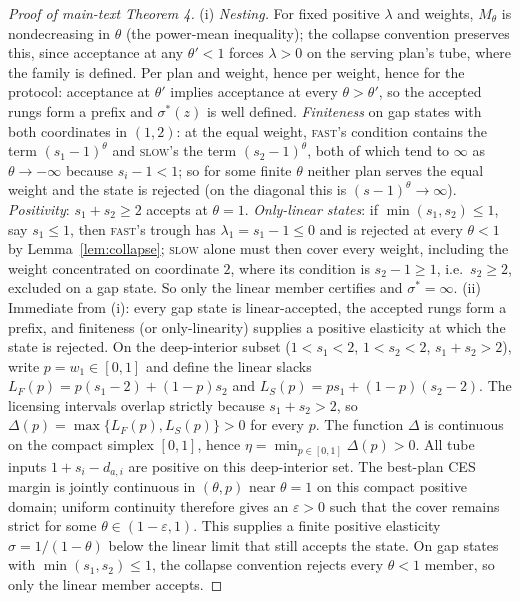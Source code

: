 \documentclass[preprint,11pt,authoryear]{elsarticle}
\theoremstyle{remark}
\newcommand{\act}[1]{\textsc{#1}}
\begin{document}
\begin{proof}[Proof of main-text Theorem 4]
(i) \emph{Nesting.} For fixed positive $\lambda$ and weights, $M_\theta$ is nondecreasing in $\theta$ (the power-mean inequality); the collapse convention preserves this, since acceptance at any $\theta'<1$ forces $\lambda>0$ on the serving plan's tube, where the family is defined. Per plan and weight, hence per weight, hence for the protocol: acceptance at $\theta'$ implies acceptance at every $\theta>\theta'$, so the accepted rungs form a prefix and $\sigma^*(z)$ is well defined. \emph{Finiteness} on gap states with both coordinates in $(1,2)$: at the equal weight, \act{fast}'s condition contains the term $(s_1-1)^\theta$ and \act{slow}'s the term $(s_2-1)^\theta$, both of which tend to $\infty$ as $\theta\to-\infty$ because $s_i-1<1$; so for some finite $\theta$ neither plan serves the equal weight and the state is rejected (on the diagonal this is $(s-1)^\theta\to\infty$). \emph{Positivity}: $s_1+s_2\ge2$ accepts at $\theta=1$. \emph{Only-linear states}: if $\min(s_1,s_2)\le1$, say $s_1\le1$, then \act{fast}'s trough has $\lambda_1=s_1-1\le0$ and is rejected at every $\theta<1$ by Lemma~\ref{lem:collapse}; \act{slow} alone must then cover every weight, including the weight concentrated on coordinate $2$, where its condition is $s_2-1\ge1$, i.e.\ $s_2\ge2$, excluded on a gap state. So only the linear member certifies and $\sigma^*=\infty$.
(ii) Immediate from (i): every gap state is linear-accepted, the accepted rungs form a prefix, and finiteness (or only-linearity) supplies a positive elasticity at which the state is rejected. On the deep-interior subset ($1<s_1<2$, $1<s_2<2$, $s_1+s_2>2$), write $p=w_1\in[0,1]$ and define the linear slacks $L_F(p)=p(s_1-2)+(1-p)s_2$ and $L_S(p)=ps_1+(1-p)(s_2-2)$. The licensing intervals overlap strictly because $s_1+s_2>2$, so $\Delta(p)=\max\{L_F(p),L_S(p)\}>0$ for every $p$. The function $\Delta$ is continuous on the compact simplex $[0,1]$, hence $\eta=\min_{p\in[0,1]}\Delta(p)>0$. All tube inputs $1+s_i-d_{a,i}$ are positive on this deep-interior set. The best-plan CES margin is jointly continuous in $(\theta,p)$ near $\theta=1$ on this compact positive domain; uniform continuity therefore gives an $\varepsilon>0$ such that the cover remains strict for some $\theta\in(1-\varepsilon,1)$. This supplies a finite positive elasticity $\sigma=1/(1-\theta)$ below the linear limit that still accepts the state. On gap states with $\min(s_1,s_2)\le1$, the collapse convention rejects every $\theta<1$ member, so only the linear member accepts.

\end{proof}
\end{document}
